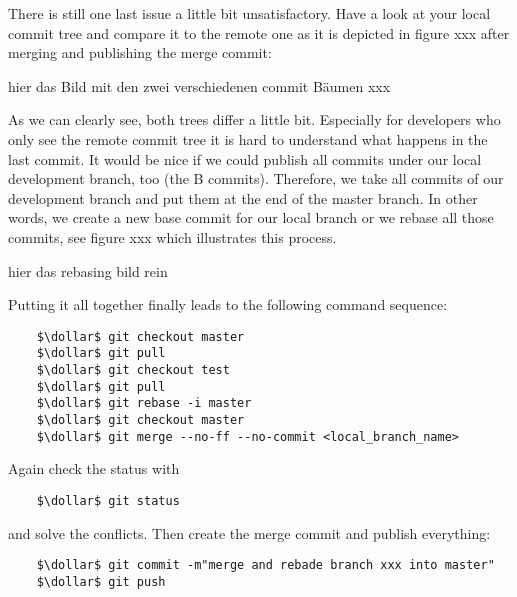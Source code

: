 There is still one last issue a little bit unsatisfactory. Have a look at your local commit tree and compare 
it to the remote one as it is depicted in figure xxx after merging and publishing the merge commit:

hier das Bild mit den zwei verschiedenen commit Bäumen xxx

As we can clearly see, both trees differ a little bit. Especially for developers who only see the remote 
commit tree it is hard to understand what happens in the last commit. It would be nice if we could publish all
commits under our local development branch, too (the B commits). Therefore, we take all commits of our development branch
and put them at the end of the master branch. In other words, we create a new base commit for our local 
branch or we rebase all those commits, see figure xxx which illustrates this process. 

hier das rebasing bild rein

Putting it all together finally leads to the following command sequence:
\begin{lstlisting}
	$\dollar$ git checkout master
	$\dollar$ git pull
	$\dollar$ git checkout test
	$\dollar$ git pull
	$\dollar$ git rebase -i master
	$\dollar$ git checkout master
	$\dollar$ git merge --no-ff --no-commit <local_branch_name>                             
\end{lstlisting}
Again check the status with
\begin{lstlisting}
	$\dollar$ git status
\end{lstlisting}
and solve the conflicts. Then create the merge commit and publish everything:
\begin{lstlisting}
	$\dollar$ git commit -m"merge and rebade branch xxx into master"  
	$\dollar$ git push 
\end{lstlisting}  